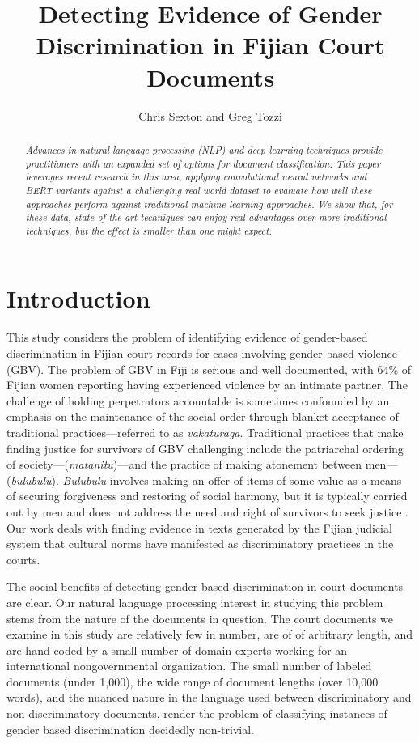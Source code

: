 \documentclass[twocolumn,10pt]{wmrDoc}
\title{Detecting Evidence of Gender Discrimination in Fijian Court Documents}
\author{Chris Sexton and Greg Tozzi
    \affiliation{
    School of Information\\
	University of California, Berkeley\\
    email: cjsexton, greg.tozzi@ischool.berkeley.edu
    }	
}
\begin{document}
\maketitle    
\begin{abstract}
{\it
Advances in natural language processing (NLP) and deep learning techniques provide practitioners with an expanded set of options for document classification. This paper leverages recent research in this area, applying convolutional neural networks and BERT variants against a challenging real world dataset to evaluate how well these approaches perform against traditional machine learning approaches.  We show that, for these data, state-of-the-art techniques can enjoy real advantages over more traditional techniques, but the effect is smaller than one might expect.
}
\end{abstract}

\section{Introduction}
This study considers the problem of identifying evidence of gender-based discrimination in Fijian court records for cases involving gender-based violence (GBV).  The problem of GBV in Fiji is serious and well documented, with 64\% of Fijian women reporting having experienced violence by an intimate partner.  The challenge of holding perpetrators accountable is sometimes confounded by an emphasis on the maintenance of the social order through blanket acceptance of traditional practices---referred to as \emph{vakaturaga}.  Traditional practices that make finding justice for survivors of GBV challenging include the patriarchal ordering of society---(\emph{matanitu})---and the practice of making atonement between men---(\emph{bulubulu}).  \emph{Bulubulu} involves making an offer of items of some value as a means of securing forgiveness and restoring of social harmony, but it is typically carried out by men and does not address the need and right of survivors to seek justice \cite{newland}.  Our work deals with finding evidence in texts generated by the Fijian judicial system that cultural norms have manifested as discriminatory practices in the courts.

The social benefits of detecting gender-based discrimination in court documents are clear.  Our natural language processing interest in studying this problem stems from the nature of the documents in question.  The court documents we examine in this study are relatively few in number, are of of arbitrary length, and are hand-coded by a small number of domain experts working for an international nongovernmental organization.  The small number of labeled documents (under 1,000), the wide range of document lengths (over 10,000 words), and the nuanced nature in the language used between discriminatory and non discriminatory documents, render the problem of classifying instances of gender based discrimination decidedly non-trivial.
\end{document}
